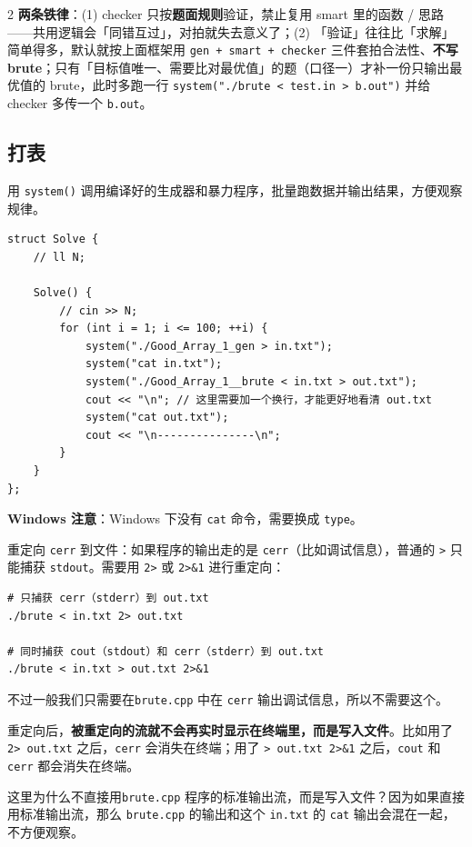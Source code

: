 \begin{multicols*}{2}
		\textbf{两条铁律}：(1) checker 只按\textbf{题面规则}验证，禁止复用 smart 里的函数 / 思路——共用逻辑会「同错互过」，对拍就失去意义了；(2) 「验证」往往比「求解」简单得多，默认就按上面框架用 \texttt{gen + smart + checker} 三件套拍合法性、\textbf{不写 brute}；只有「目标值唯一、需要比对最优值」的题（口径一）才补一份只输出最优值的 brute，此时多跑一行 \texttt{system("./brute < test.in > b.out")} 并给 checker 多传一个 \texttt{b.out}。

		\subsection{打表}

		用 \texttt{system()} 调用编译好的生成器和暴力程序，批量跑数据并输出结果，方便观察规律。

		\begin{verbatim}
struct Solve {
	// ll N;

	Solve() {
		// cin >> N;
		for (int i = 1; i <= 100; ++i) {
			system("./Good_Array_1_gen > in.txt");
			system("cat in.txt");
			system("./Good_Array_1__brute < in.txt > out.txt");
			cout << "\n"; // 这里需要加一个换行，才能更好地看清 out.txt
			system("cat out.txt");
			cout << "\n---------------\n";
		}
	}
};
		\end{verbatim}

		\textbf{Windows 注意}：Windows 下没有 \texttt{cat} 命令，需要换成 \texttt{type}。

		重定向 \texttt{cerr} 到文件：如果程序的输出走的是 \texttt{cerr}（比如调试信息），普通的 \texttt{>} 只能捕获 \texttt{stdout}。需要用 \texttt{2>} 或 \texttt{2>\&1} 进行重定向：

		\begin{verbatim}
# 只捕获 cerr（stderr）到 out.txt
./brute < in.txt 2> out.txt

# 同时捕获 cout（stdout）和 cerr（stderr）到 out.txt
./brute < in.txt > out.txt 2>&1
		\end{verbatim}

		不过一般我们只需要在\texttt{brute.cpp} 中在 \texttt{cerr} 输出调试信息，所以不需要这个。

		重定向后，\textbf{被重定向的流就不会再实时显示在终端里，而是写入文件}。比如用了 \texttt{2> out.txt} 之后，\texttt{cerr} 会消失在终端；用了 \texttt{> out.txt 2>\&1} 之后，\texttt{cout} 和 \texttt{cerr} 都会消失在终端。

		这里为什么不直接用\texttt{brute.cpp} 程序的标准输出流，而是写入文件？因为如果直接用标准输出流，那么 \texttt{brute.cpp} 的输出和这个 \texttt{in.txt} 的 \texttt{cat} 输出会混在一起，不方便观察。


\end{multicols*}
